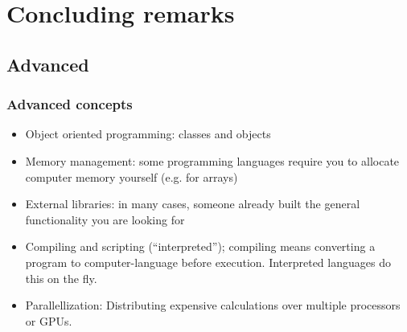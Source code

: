 \section{Concluding remarks}
\subsection*{Advanced}
\begin{frame}
  \frametitle{Advanced concepts}
  \begin{itemize}
    \item Object oriented programming: classes and objects
    \item Memory management: some programming languages require you to allocate computer memory yourself (e.g. for arrays)
    \item External libraries: in many cases, someone already built the general functionality you are looking for
    \item Compiling and scripting (``interpreted''); compiling means converting a program to computer-language before execution. Interpreted languages do this on the fly.
    \item Parallellization: Distributing expensive calculations over multiple processors or GPUs.
  \end{itemize}\pause
 \end{frame}


